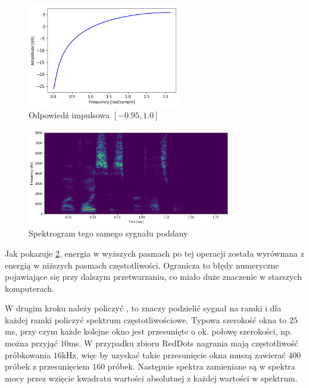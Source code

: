 \begin{figure}[H]
    \centering
    \includegraphics[width=0.6\textwidth]{images/2_1_c_preemphasis_response}
    \caption{Odpowiedź impulsowa  $[-0.95, 1.0]$}
    \label{fig:2_1_c_preemphasis_response}
\end{figure}

\begin{figure}[H]
    \centering
    \includegraphics[width=0.8\textwidth]{images/2_1_b_example_preemphasis}
    \caption{Spektrogram tego samego sygnału poddany }
    \label{fig:2_1_b_example_preemphasis}
\end{figure}

Jak pokazuje \ref{fig:2_1_b_example_preemphasis}, energia w wyższych pasmach po tej operacji
została wyrównana z energią w niższych pasmach częstotliwości. Ogranicza to błędy numeryczne
pojawiające się przy dalszym przetwarzaniu, co miało duże znaczenie w starszych komputerach.

W drugim kroku należy policzyć , to znaczy podzielić
sygnał na ramki i dla każdej ramki policzyć spektrum częstotliwościowe. Typowa szerokość
okna to $25$ms, przy czym każde kolejne okno jest przesunięte o ok. połowę szerokości,
np. można przyjąć $10$ms. W przypadku zbioru RedDots nagrania mają częstotliwość próbkowania $16$kHz,
więc by uzyskać takie przesunięcie okna muszą zawierać $400$ próbek z przesunięciem $160$ próbek.
Następnie spektra zamieniane są w spektra mocy przez wzięcie kwadratu wartości absolutnej
z każdej wartości w spektrum.

